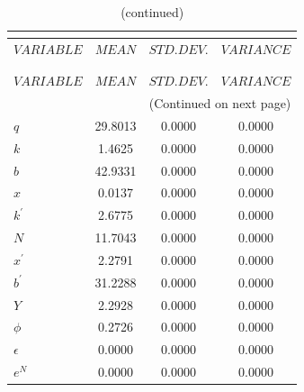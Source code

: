  
\begin{center}
\begin{longtable}{lccc} 
\caption{THEORETICAL MOMENTS}\\
 \label{Table:th_moments}\\
\toprule 
$VARIABLE  $	 & 	 $         MEAN$	 & 	 $    STD. DEV.$	 & 	 $     VARIANCE$\\
\midrule \endfirsthead 
\caption{(continued)}\\
 \toprule \\ 
$VARIABLE  $	 & 	 $         MEAN$	 & 	 $    STD. DEV.$	 & 	 $     VARIANCE$\\
\midrule \endhead 
\midrule \multicolumn{4}{r}{(Continued on next page)} \\ \bottomrule \endfoot 
\bottomrule \endlastfoot 
$q         $	 & 	      29.8013	 & 	       0.0000	 & 	       0.0000 \\ 
$k         $	 & 	       1.4625	 & 	       0.0000	 & 	       0.0000 \\ 
$b         $	 & 	      42.9331	 & 	       0.0000	 & 	       0.0000 \\ 
$x         $	 & 	       0.0137	 & 	       0.0000	 & 	       0.0000 \\ 
$k^\prime  $	 & 	       2.6775	 & 	       0.0000	 & 	       0.0000 \\ 
$N         $	 & 	      11.7043	 & 	       0.0000	 & 	       0.0000 \\ 
$x^\prime  $	 & 	       2.2791	 & 	       0.0000	 & 	       0.0000 \\ 
$b^\prime  $	 & 	      31.2288	 & 	       0.0000	 & 	       0.0000 \\ 
$Y         $	 & 	       2.2928	 & 	       0.0000	 & 	       0.0000 \\ 
$\phi      $	 & 	       0.2726	 & 	       0.0000	 & 	       0.0000 \\ 
$\epsilon  $	 & 	       0.0000	 & 	       0.0000	 & 	       0.0000 \\ 
$e^N       $	 & 	       0.0000	 & 	       0.0000	 & 	       0.0000 \\ 
\end{longtable}
 \end{center}
